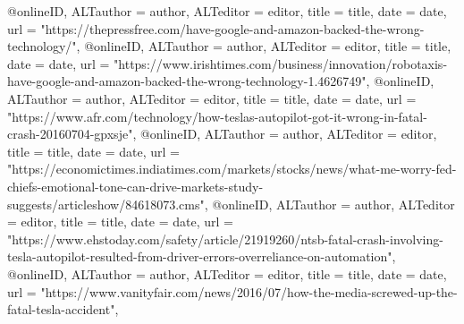 {{{@online{ID,	ALTauthor = {author},	ALTeditor = {editor},	title = {title},	date = {date},	url = {"https://thepressfree.com/have-google-and-amazon-backed-the-wrong-technology/"},}
@online{ID,	ALTauthor = {author},	ALTeditor = {editor},	title = {title},	date = {date},	url = {"https://www.irishtimes.com/business/innovation/robotaxis-have-google-and-amazon-backed-the-wrong-technology-1.4626749"},}
@online{ID,	ALTauthor = {author},	ALTeditor = {editor},	title = {title},	date = {date},	url = {"https://www.afr.com/technology/how-teslas-autopilot-got-it-wrong-in-fatal-crash-20160704-gpxsje"},}
@online{ID,	ALTauthor = {author},	ALTeditor = {editor},	title = {title},	date = {date},	url = {"https://economictimes.indiatimes.com/markets/stocks/news/what-me-worry-fed-chiefs-emotional-tone-can-drive-markets-study-suggests/articleshow/84618073.cms"},}
@online{ID,	ALTauthor = {author},	ALTeditor = {editor},	title = {title},	date = {date},	url = {"https://www.ehstoday.com/safety/article/21919260/ntsb-fatal-crash-involving-tesla-autopilot-resulted-from-driver-errors-overreliance-on-automation"},}
@online{ID,	ALTauthor = {author},	ALTeditor = {editor},	title = {title},	date = {date},	url = {"https://www.vanityfair.com/news/2016/07/how-the-media-screwed-up-the-fatal-tesla-accident"},}


}}}
